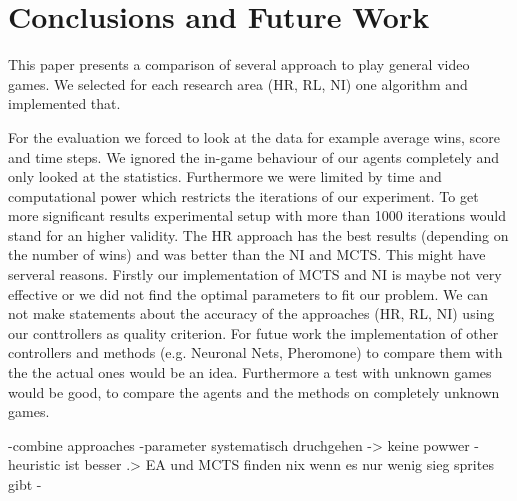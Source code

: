 \section{Conclusions and Future Work} 
\label{sec:conc}

This paper presents a comparison of several approach to play general video games. We selected for each research area (\ac{HR}, \ac{RL}, \ac{NI})
one algorithm and implemented that. 


For the evaluation we forced to look at the data for example average wins, score and time steps.
We ignored the in-game behaviour of our agents completely and only looked at the statistics. 
Furthermore we were limited by time and computational power which restricts the iterations of our experiment. 
To get more significant results experimental setup with more than 1000 iterations would stand for an higher validity.
The \ac{HR} approach has the best results (depending on the number of wins) and was better than the \ac{NI} and \ac{MCTS}. This might have serveral reasons. Firstly our implementation of \ac{MCTS} and \ac{NI} is maybe not very effective or we did not find the optimal parameters to fit our problem. We can not make statements about the accuracy of the approaches (\acs{HR}, \acs{RL}, \acs{NI}) using our conttrollers as quality criterion.
For futue work the implementation of other controllers and methods (e.g. Neuronal Nets, Pheromone) to compare them with the the actual ones would be an idea. Furthermore a test with unknown games would be good, to compare the agents and the methods on completely unknown games.

-combine approaches 
-parameter systematisch druchgehen -> keine powwer
-heuristic ist besser .> EA und MCTS finden nix wenn es nur wenig sieg sprites gibt
-


